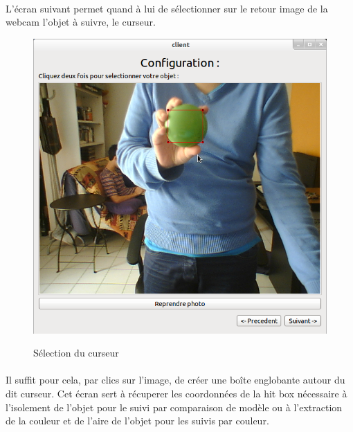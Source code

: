 \documentclass{report}
\begin{document}
				\paragraph{}
				L'écran suivant permet quand à lui de sélectionner sur le retour image de la webcam l'objet à suivre, le curseur.\\
				\begin{figure}[!h]
						\centering
						\includegraphics[scale=0.35]{../images/Capture1.png}\\
						\caption{Sélection du curseur}
						\label{Sélection du curseur}
				\end{figure}
				\paragraph{}
				Il suffit pour cela, par clics sur l'image, de créer une boîte englobante autour du dit curseur.
				Cet écran sert à récuperer les coordonnées de la hit box nécessaire à l'isolement de l'objet pour le suivi par comparaison de modèle ou à l'extraction de la couleur et de l'aire de l'objet pour les suivis par couleur.
				\newpage
\end{document}
